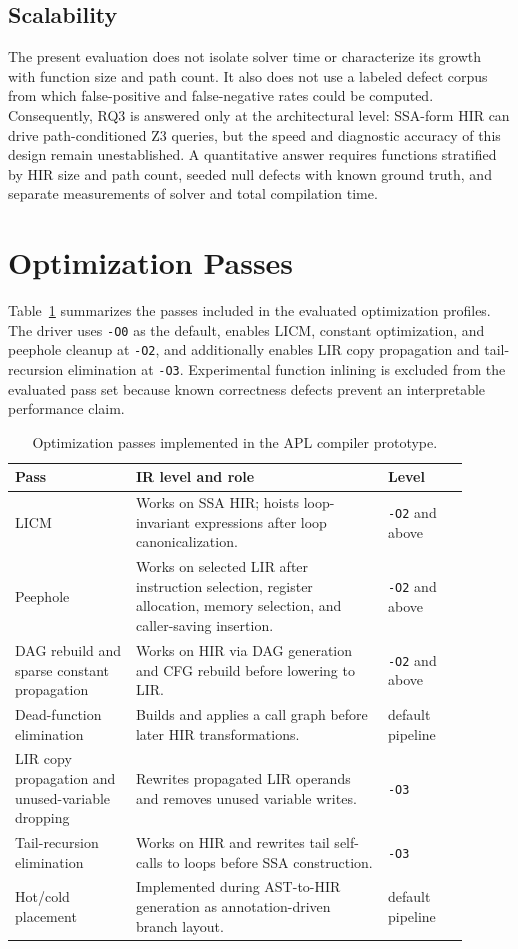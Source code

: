\documentclass[10pt,twocolumn]{article}
\begin{document}
\subsection{Scalability}

\par The present evaluation does not isolate solver time or characterize its growth with function size and path count. It also does not use a labeled defect corpus from which false-positive and false-negative rates could be computed. Consequently, RQ3 is answered only at the architectural level: SSA-form HIR can drive path-conditioned Z3 queries, but the speed and diagnostic accuracy of this design remain unestablished. A quantitative answer requires functions stratified by HIR size and path count, seeded null defects with known ground truth, and separate measurements of solver and total compilation time.

\section{Optimization Passes}

\par Table~\ref{tab:optimizations} summarizes the passes included in the evaluated optimization profiles. The driver uses \texttt{-O0} as the default, enables LICM, constant optimization, and peephole cleanup at \texttt{-O2}, and additionally enables LIR copy propagation and tail-recursion elimination at \texttt{-O3}. Experimental function inlining is excluded from the evaluated pass set because known correctness defects prevent an interpretable performance claim.

\begin{table}[t]
\centering
\caption{Optimization passes implemented in the APL compiler prototype.}
\label{tab:optimizations}
\begin{tabular}{p{0.24\linewidth}p{0.50\linewidth}p{0.16\linewidth}}
\toprule
Pass & IR level and role & Level \\
\midrule
LICM & Works on SSA HIR; hoists loop-invariant expressions after loop canonicalization. & \texttt{-O2} and above \\
Peephole & Works on selected LIR after instruction selection, register allocation, memory selection, and caller-saving insertion. & \texttt{-O2} and above \\
DAG rebuild and sparse constant propagation & Works on HIR via DAG generation and CFG rebuild before lowering to LIR. & \texttt{-O2} and above \\
Dead-function elimination & Builds and applies a call graph before later HIR transformations. & default pipeline \\
LIR copy propagation and unused-variable dropping & Rewrites propagated LIR operands and removes unused variable writes. & \texttt{-O3} \\
Tail-recursion elimination & Works on HIR and rewrites tail self-calls to loops before SSA construction. & \texttt{-O3} \\
Hot/cold placement & Implemented during AST-to-HIR generation as annotation-driven branch layout. & default pipeline \\
\bottomrule
\end{tabular}
\end{table}
\end{document}
